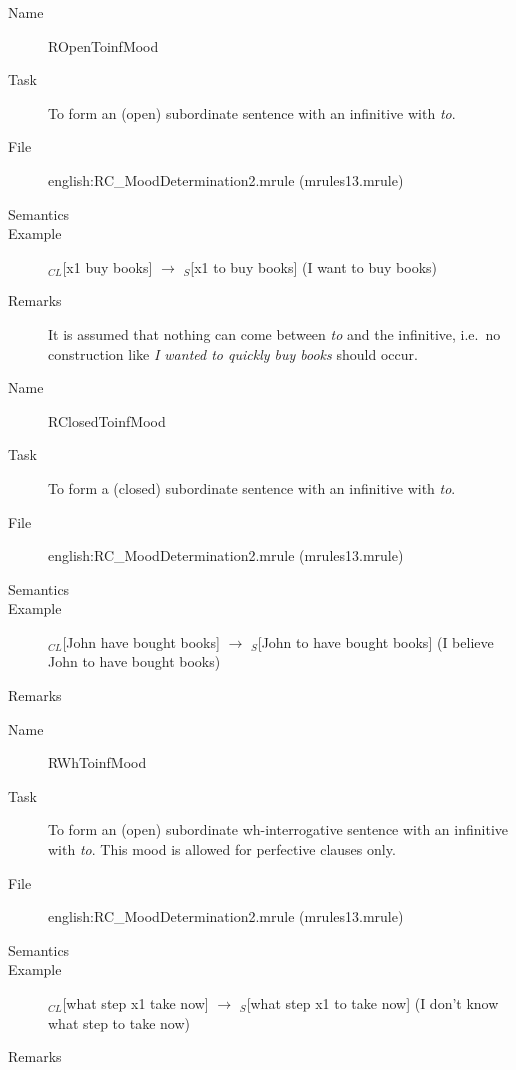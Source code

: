 \begin{description}
\vspace{1 cm}
\begin{description}
\item[Name] ROpenToinfMood
\item[Task] To form an (open) subordinate sentence with an infinitive with {
\em to\/}.
\item[File] english:RC\_MoodDetermination2.mrule (mrules13.mrule)
\item[Semantics]
\item[Example] $_{CL}$[x1 buy books] $\rightarrow$ $_S$[x1 to buy books] (I 
want to buy books)
\item[Remarks] It is assumed that nothing can come between {\em to\/} and the 
infinitive, i.e.\ no construction like {\em I wanted to quickly buy books\/} 
should occur.
\end{description}

\vspace{1 cm}
\begin{description}
\item[Name] RClosedToinfMood
\item[Task] To form a (closed) subordinate sentence with an infinitive with {
\em to\/}.
\item[File] english:RC\_MoodDetermination2.mrule (mrules13.mrule)
\item[Semantics]
\item[Example] $_{CL}$[John have bought books] $\rightarrow$ $_S$[John to have 
bought books] (I believe John to have bought books)
\item[Remarks]
\end{description}

\vspace{1 cm}
\begin{description}
\item[Name] RWhToinfMood
\item[Task] To form an (open) subordinate wh-interrogative sentence with an 
infinitive with {\em to\/}. This mood is allowed for perfective clauses only.
\item[File] english:RC\_MoodDetermination2.mrule (mrules13.mrule)
\item[Semantics]
\item[Example] $_{CL}$[what step x1 take now] $\rightarrow$ $_S$[what step x1 
to take now] (I don't know what step to take now)
\item[Remarks]
\end{description}


\end{description}
